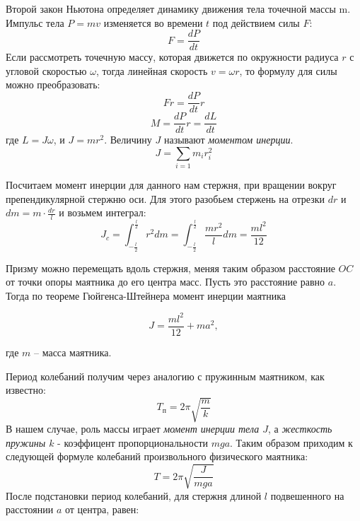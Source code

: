 \documentclass[a4paper,12pt]{article}
\begin{document}
 	Второй закон Ньютона определяет динамику движения тела точечной массы m. Импульс тела $P=mv$ изменяется во времени $t$ под действием силы $F$:
 	\begin{equation}
 		F = \frac{dP}{dt}
 	\end{equation}
 	Если рассмотреть точечную массу, которая движется по окружности радиуса $r$ с угловой скоростью $\omega$, тогда линейная скорость $v = \omega r$, то формулу для силы можно преобразовать:
 	\begin{equation}
 		Fr = \frac{dP}{dt}r
 	\end{equation}
 	\begin{equation}
 		M=\frac{dP}{dt}r=\frac{dL}{dt}
 	\end{equation}
 	\noindent где $L = J\omega$, и $J = mr^2$. Величину $J$ называют \textit{моментом инерции}.
 	\begin{equation}
 		J = \sum_{i=1} m_i r_i^2
 	\end{equation}
 	\par Посчитаем момент инерции для данного нам стержня, при вращении вокруг препендикулярной стержню оси. Для этого разобьем стержень на отрезки $dr$ и $dm = m\cdot\frac{dr}{l}$ и возьмем интеграл:
 	\begin{equation}
 		J_c = \int_{-\frac{l}{2}}^{\frac{l}{2}}r^2dm = \int_{-\frac{l}{2}}^{\frac{l}{2}}\frac{mr^2}{l}dm = \frac{ml^2}{12} 
 	\end{equation}
 	
 	
 	Призму можно перемещать вдоль стержня, меняя таким образом расстояние $ OC $ от точки опоры маятника до его центра масс. Пусть это расстояние равно $ a $. Тогда по теореме Гюйгенса-Штейнера момент инерции маятника
 	
 	\begin{equation}
 		J=\frac{ml^2}{12}+ma^2,
 	\end{equation}
 	
 	\noindent где $ m $ -- масса маятника.
 	
 	
 	Период колебаний получим через аналогию с пружинным маятником, как известно: \begin{equation}
 		T_\text{п}=2\pi\sqrt{\frac{m}{k}}
 	\end{equation}
 	\noindent В нашем случае, роль массы играет \textit{момент инерции тела $J$}, а \textit{жесткость пружины $k$} - коэффицент пропорциональности $mga$. Таким образом приходим к следующей формуле колебаний произвольного физического маятника:
 	\begin{equation}
 		T=2\pi\sqrt{\frac{J}{mga}}
 	\end{equation}
 	\noindent После подстановки период колебаний, для стержня длиной $l$ подвешенного на расстоянии $a$ от центра, равен:
 	
\end{document}
